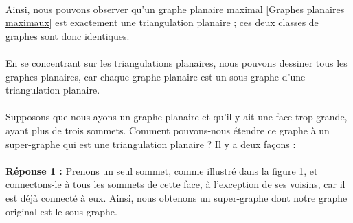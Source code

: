 \documentclass[hidelinks,letterpaper,12pt]{article}
\newcounter{Exemple} %
\begin{document}
\\
Ainsi, nous pouvons observer qu'un graphe planaire maximal \ref{Graphes planaires maximaux} est exactement une triangulation planaire ; ces deux classes de graphes sont donc identiques.
\\ \\
En se concentrant sur les triangulations planaires, nous pouvons dessiner tous les graphes planaires, car chaque graphe planaire est un sous-graphe d'une triangulation planaire.
\\ \\
Supposons que nous ayons un graphe planaire et qu'il y ait une face trop grande, ayant plus de trois sommets. Comment pouvons-nous étendre ce graphe à un super-graphe qui est une triangulation planaire ? Il y a deux façons :
\\ \\
\textbf{Réponse 1 :} 	
\bigbreak 	
Prenons un seul sommet, comme illustré dans la figure \ref{Exemple 1, transformer un sous-graphe en super-graphe}, et connectons-le à tous les sommets de cette face, à l'exception de ses voisins, car il est déjà connecté à eux. Ainsi, nous obtenons un super-graphe dont notre graphe original est le sous-graphe.
\\
\begin{figure}[H]
\centering	
{}
\label{Exemple 1, transformer un sous-graphe en super-graphe}
\end{figure}
\end{document}
